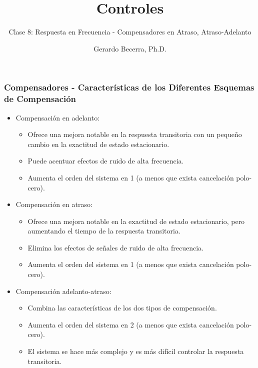 \documentclass[aspectratio=169, handout]{beamer}
\title{Controles}
\subtitle{\small Clase 8: Respuesta en Frecuencia - Compensadores en Atraso, Atraso-Adelanto}
\author{Gerardo Becerra, Ph.D.}
\institute{Pontificia Universidad Javeriana\\ Departamento de Electrónica}
\date{}
\theoremstyle{definition}
\theoremstyle{plain}
\theoremstyle{remark}
\begin{document}
\frame{\titlepage}	

\begin{frame}[<+->]\frametitle{Compensadores - Características de los Diferentes Esquemas de Compensación}
 	\begin{itemize}
 		\item Compensación en adelanto:
 		\begin{itemize} 
 			\item Ofrece una mejora notable en la respuesta transitoria con un pequeño cambio en la exactitud de estado estacionario.
 			\item Puede acentuar efectos de ruido de alta frecuencia.
 			\item Aumenta el orden del sistema en 1 (a menos que exista cancelación polo-cero).
 		\end{itemize}
 		\item Compensación en atraso:
 		\begin{itemize}
 			\item Ofrece una mejora notable en la exactitud de estado estacionario, pero aumentando el tiempo de la respuesta transitoria.
 			\item Elimina los efectos de señales de ruido de alta frecuencia.
 			\item Aumenta el orden del sistema en 1 (a menos que exista cancelación polo-cero).
 		\end{itemize}
 		\item Compensación adelanto-atraso:
 		\begin{itemize}
 			\item Combina las características de los dos tipos de compensación.
 			\item Aumenta el orden del sistema en 2 (a menos que exista cancelación polo-cero).
 			\item El sistema se hace más complejo y es más difícil controlar la respuesta transitoria.
 		\end{itemize}
  \end{itemize}    
\end{frame}
\end{document}
